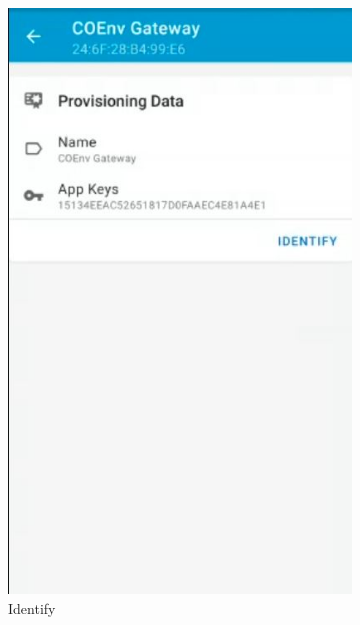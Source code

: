 \documentclass[../monografia.tex]{subfiles}
\begin{document}
\begin{figure}[h]
	\centering
	\begin{subfigure}[b]{0.22\textwidth}
		\centering
		\includegraphics[width=\textwidth]{mesh-bind-1}
		\caption{Identify}
		\label{fig:mesh-bind-1}
	\end{subfigure}
	\begin{subfigure}[b]{0.22\textwidth}
		\centering

\end{subfigure}
\end{figure}
\end{document}
